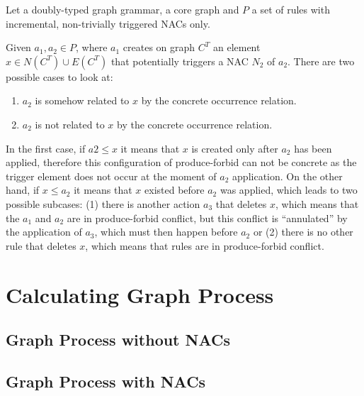 \begin{definition} Let \doublyTypedGraphGrammarCore{} a doubly-typed graph grammar, \coreGraph{} a core graph and $P$ a set of rules with incremental, non-trivially triggered NACs only.

  Given $a_1,a_2 \in P$, where $a_1$ creates on graph $C^T$ an element $x \in N(C^T) \cup E(C^T)$ that potentially triggers a NAC $N_2$ of $a_2$. There are two possible cases to look at:

  \begin{enumerate}
    \item $a_2$ is somehow related to $x$ by the concrete occurrence relation.
    \item $a_2$ is not related to $x$ by the concrete occurrence relation.
  \end{enumerate}

  In the first case, if $a2 \leq x$ it means that $x$ is created only after $a_2$ has been applied, therefore this configuration of produce-forbid can not be concrete as the trigger element does not occur at the moment of $a_2$ application. On the other hand, if $x \leq a_2$ it means that $x$ existed before $a_2$ was applied, which leads to two possible subcases: (1) there is another action $a_3$ that deletes $x$, which means that the $a_1$ and $a_2$ are in produce-forbid conflict, but this
  conflict is ``annulated'' by the application of $a_3$, which must then happen before $a_2$ or (2) there is no other rule that deletes $x$, which means that rules are in
  produce-forbid conflict.
\end{definition}

\begin{definition}
\end{definition}

\begin{definition}
\end{definition}

\begin{definition}
\end{definition}

\section{Calculating Graph Process}

\subsection{Graph Process without NACs}

\begin{definition}
\end{definition}

\subsection{Graph Process with NACs}

\begin{definition}
\end{definition}

\begin{definition}
\end{definition}
